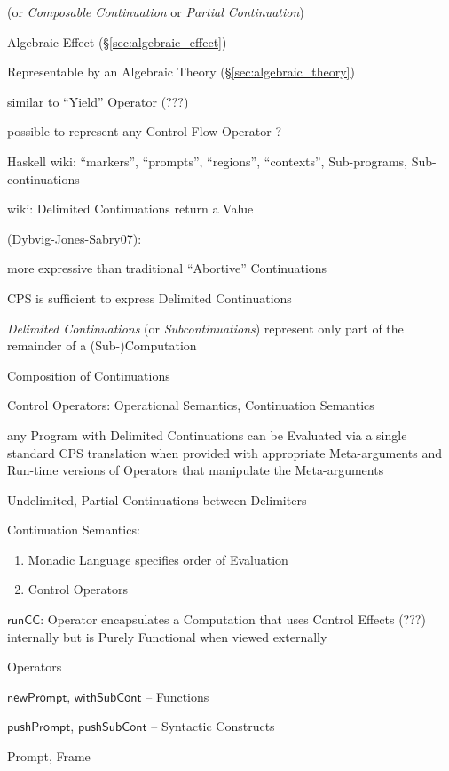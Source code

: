 (or \emph{Composable Continuation} or \emph{Partial Continuation})

Algebraic Effect (\S\ref{sec:algebraic_effect})

Representable by an Algebraic Theory (\S\ref{sec:algebraic_theory})

similar to ``Yield'' Operator (???) %

possible to represent any Control Flow Operator ? %

Haskell wiki: ``markers'', ``prompts'', ``regions'', ``contexts'',
Sub-programs, Sub-continuations

wiki: Delimited Continuations return a Value


(Dybvig-Jones-Sabry07):

more expressive than traditional ``Abortive'' Continuations

CPS is sufficient to express Delimited Continuations

\emph{Delimited Continuations} (or \emph{Subcontinuations}) represent
only part of the remainder of a (Sub-)Computation

Composition of Continuations

Control Operators: Operational Semantics, Continuation Semantics

any Program with Delimited Continuations can be Evaluated via a single
standard CPS translation when provided with appropriate Meta-arguments
and Run-time versions of Operators that manipulate the Meta-arguments

Undelimited, Partial Continuations between Delimiters

Continuation Semantics:
\begin{enumerate}
  \item Monadic Language specifies order of Evaluation
  \item Control Operators
\end{enumerate}

$\mathsf{runCC}$: Operator encapsulates a Computation that uses Control
Effects (???) internally but is Purely Functional when viewed
externally %

Operators

$\mathsf{newPrompt}$,
$\mathsf{withSubCont}$ -- Functions

$\mathsf{pushPrompt}$,
$\mathsf{pushSubCont}$ -- Syntactic Constructs

Prompt, Frame



